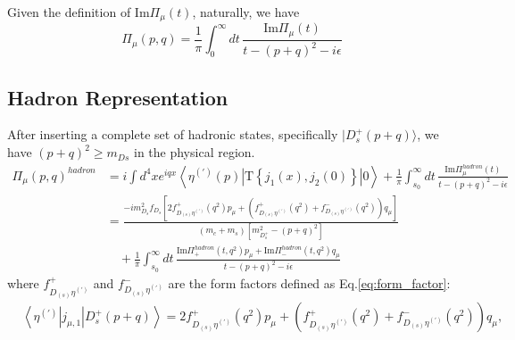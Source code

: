 Given the definition of $\mathrm{Im}\Pi_\mu(t)$, naturally, we have
\begin{equation}
    \Pi_\mu(p, q)= \frac{1}{\pi} \int_{0}^{\infty} dt\, \frac{\mathrm{Im}\Pi_\mu(t)}{t-(p+q)^{2}-i\epsilon}
    \label{eq:dispersion_relation}
\end{equation}


\subsection{Hadron Representation}
After inserting a complete set of hadronic states, specifically $|D_{s}^{+}(p+q)\rangle$, we have $(p+q)^{2} \geq m_{Ds}$ in the physical region.
\begin{equation}
    \begin{aligned}
        \Pi_\mu(p, q)^{hadron} & = i \int d^4 x e^{i q x}\left\langle \eta^{(\prime)}(p)\left|\mathrm{T}\left\{j_{1}(x), j_{2}(0)\right\}\right| 0\right\rangle + \frac{1}{\pi}  \int_{s_0}^{\infty} dt\, \frac{\mathrm{Im}\Pi_\mu^{hadron}(t)}{t-(p+q)^{2}-i\epsilon}              \\
                               & = \frac{-i m_{D_s}^2 f_{D_s}[2 f_{D_{(s)} \eta^{(\prime)}}^{+}\left(q^2\right) p_\mu+\left(f_{D_{(s)} \eta^{(\prime)}}^{+}\left(q^2\right)+f_{D_{(s)} \eta^{(\prime)}}^{-}\left(q^2\right)\right)q_\mu]}{(m_c+m_s)[m^{2}_{D_{s}^{+}} - (p+q)^{2}]} \\
                               & \quad + \frac{1}{\pi} \int_{s_0}^{\infty} dt\, \frac{\mathrm{Im}\Pi_{+}^{hadron}(t,q^{2})p_{\mu} + \mathrm{Im}\Pi_{-}^{hadron}(t,q^{2})q_{\mu}}{t-(p+q)^{2}-i\epsilon}
    \end{aligned}
    \label{eq:hadron_rep}
\end{equation}
where $f_{D_{(s)} \eta^{(\prime)}}^{+}$ and $f_{D_{(s)} \eta^{(\prime)}}^{-}$ are the form factors defined as Eq.\ref{eq:form_factor}:
\begin{equation}
    \begin{aligned}
         & \left\langle \eta^{(\prime)}|j_{\mu,1}|D_{s}^{+}(p+q)\right\rangle=2 f_{D_{(s)} \eta^{(\prime)}}^{+}\left(q^2\right) p_\mu+\left(f_{D_{(s)} \eta^{(\prime)}}^{+}\left(q^2\right)+f_{D_{(s)} \eta^{(\prime)}}^{-}\left(q^2\right)\right) q_\mu,
    \end{aligned}
    \label{eq:form_factor}
\end{equation}

